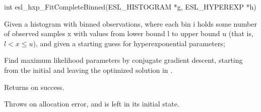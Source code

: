 \begin{sreapi}
\hypertarget{func:esl_hxp_FitCompleteBinned()}
{\item[int esl\_hxp\_FitCompleteBinned(ESL\_HISTOGRAM *g, ESL\_HYPEREXP *h)]}

Given a histogram  with binned observations, where each
bin i holds some number of observed samples x with values from 
lower bound l to upper bound u (that is, $l < x \leq u$),
and given a starting guess  for hyperexponential parameters;

Find maximum likelihood parameters  by conjugate gradient
descent, starting from the initial  and leaving the
optimized solution in .

Returns  on success.

Throws  on allocation error, and  is left in its
initial state.


\end{sreapi}

